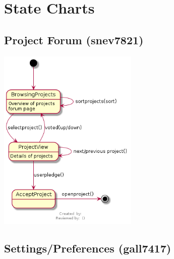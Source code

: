 \documentclass[11pt]{report}
\begin{document}
\chapter{State Charts}
    \section{Project Forum (snev7821)}
        \begin{minipage}{1\textwidth}
            \begin{center}
                \includegraphics[width=0.5\textwidth]{diagrams/statechart-projectforum}
            \end{center}
        \end{minipage}
    
    \section{Settings/Preferences (gall7417)}
        \begin{minipage}{1\textwidth}
            \begin{center}
            \end{center}
        \end{minipage}
    
\end{document}
